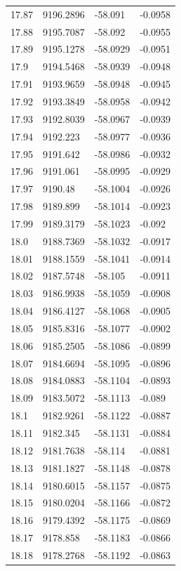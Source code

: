 \begin{table}[H]
\begin{tabular}{llll}
17.87 & 9196.2896 & -58.091 & -0.0958 \\
17.88 & 9195.7087 & -58.092 & -0.0955 \\
17.89 & 9195.1278 & -58.0929 & -0.0951 \\
17.9 & 9194.5468 & -58.0939 & -0.0948 \\
17.91 & 9193.9659 & -58.0948 & -0.0945 \\
17.92 & 9193.3849 & -58.0958 & -0.0942 \\
17.93 & 9192.8039 & -58.0967 & -0.0939 \\
17.94 & 9192.223 & -58.0977 & -0.0936 \\
17.95 & 9191.642 & -58.0986 & -0.0932 \\
17.96 & 9191.061 & -58.0995 & -0.0929 \\
17.97 & 9190.48 & -58.1004 & -0.0926 \\
17.98 & 9189.899 & -58.1014 & -0.0923 \\
17.99 & 9189.3179 & -58.1023 & -0.092 \\
18.0 & 9188.7369 & -58.1032 & -0.0917 \\
18.01 & 9188.1559 & -58.1041 & -0.0914 \\
18.02 & 9187.5748 & -58.105 & -0.0911 \\
18.03 & 9186.9938 & -58.1059 & -0.0908 \\
18.04 & 9186.4127 & -58.1068 & -0.0905 \\
18.05 & 9185.8316 & -58.1077 & -0.0902 \\
18.06 & 9185.2505 & -58.1086 & -0.0899 \\
18.07 & 9184.6694 & -58.1095 & -0.0896 \\
18.08 & 9184.0883 & -58.1104 & -0.0893 \\
18.09 & 9183.5072 & -58.1113 & -0.089 \\
18.1 & 9182.9261 & -58.1122 & -0.0887 \\
18.11 & 9182.345 & -58.1131 & -0.0884 \\
18.12 & 9181.7638 & -58.114 & -0.0881 \\
18.13 & 9181.1827 & -58.1148 & -0.0878 \\
18.14 & 9180.6015 & -58.1157 & -0.0875 \\
18.15 & 9180.0204 & -58.1166 & -0.0872 \\
18.16 & 9179.4392 & -58.1175 & -0.0869 \\
18.17 & 9178.858 & -58.1183 & -0.0866 \\
18.18 & 9178.2768 & -58.1192 & -0.0863 \\

\end{tabular}
\end{table}
